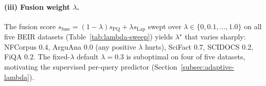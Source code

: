\documentclass[review,1p]{elsarticle}
\begin{document}
\begin{table}[h]
\centering
\small
\caption{Component complementarity metrics across three BEIR datasets. Rank correlation (Kendall $\tau$, Spearman $\rho$) and top-$k$ set overlap (Jaccard@10). Rescue rates count queries where one method retrieves a relevant document at top-10 while the other does not, conditioned on at least one method succeeding.}
\label{tab:complementarity}
\end{table}


\paragraph{(iii) Fusion weight $\lambda$.} The fusion score $s_{\mathrm{fuse}} = (1-\lambda) s_{\mathrm{PQ}} + \lambda s_{\mathrm{Lap}}$ swept over $\lambda \in \{0, 0.1, \ldots, 1.0\}$ on all five BEIR datasets (Table~\ref{tab:lambda-sweep}) yields $\lambda^\star$ that varies sharply: NFCorpus $0.4$, ArguAna $0.0$ (any positive $\lambda$ hurts), SciFact $0.7$, SCIDOCS $0.2$, FiQA $0.2$. The fixed-$\lambda$ default $\lambda = 0.3$ is suboptimal on four of five datasets, motivating the supervised per-query predictor (Section~\ref{subsec:adaptive-lambda}).
\end{document}
